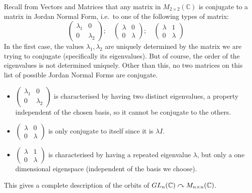 Recall from Vectors and Matrices that any matrix in \(M_{2 \times 2}(\mathbb C)\) is conjugate to a matrix in Jordan Normal Form, i.e.\ to one of the following types of matrix:
\[
	\begin{pmatrix}
		\lambda_1 & 0 \\ 0 & \lambda_2
	\end{pmatrix};\quad \begin{pmatrix}
		\lambda & 0 \\ 0 & \lambda
	\end{pmatrix};\quad \begin{pmatrix}
		\lambda & 1 \\ 0 & \lambda
	\end{pmatrix}
\]
In the first case, the values \(\lambda_1, \lambda_2\) are uniquely determined by the matrix we are trying to conjugate (specifically its eigenvalues).
But of course, the order of the eigenvalues is not determined uniquely.
Other than this, no two matrices on this list of possible Jordan Normal Forms are conjugate.
\begin{itemize}
	\item \(\begin{pmatrix}
		      \lambda_1 & 0 \\ 0 & \lambda_2
	      \end{pmatrix}\) is characterised by having two distinct eigenvalues, a property independent of the chosen basis, so it cannot be conjugate to the others.
	\item \(\begin{pmatrix}
		      \lambda & 0 \\ 0 & \lambda
	      \end{pmatrix}\) is only conjugate to itself since it is \(\lambda I\).
	\item \(\begin{pmatrix}
		      \lambda & 1 \\ 0 & \lambda
	      \end{pmatrix}\) is characterised by having a repeated eigenvalue \(\lambda\), but only a one dimensional eigenspace (independent of the basis we choose).
\end{itemize}
This gives a complete description of the orbits of \(GL_n(\mathbb C) \curvearrowright M_{n \times n}(\mathbb C)\).

